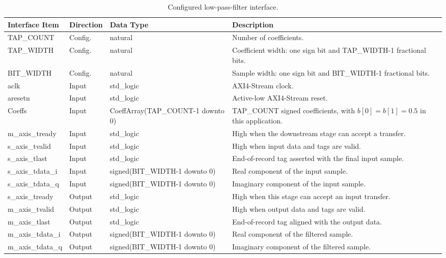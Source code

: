 \begin{table}[H]
\singlespacing
\small
\setlength{\tabcolsep}{2pt}
\renewcommand{\arraystretch}{0.95}
\begin{center}
\caption{Configured low-pass-filter interface.}
\setlength{\tabcolsep}{4pt}
\begin{tabularx}{\textwidth}{|L{0.24\textwidth}|L{0.13\textwidth}|L{0.28\textwidth}|Y|}
\hline
\textbf{Interface Item} & \textbf{Direction} & \textbf{Data Type} & \textbf{Description} \\
\hline
TAP\_COUNT     & Config. & natural & Number of coefficients. \\
\hline
TAP\_WIDTH     & Config. & natural & Coefficient width: one sign bit and TAP\_WIDTH-1 fractional bits. \\
\hline
BIT\_WIDTH     & Config. & natural & Sample width: one sign bit and BIT\_WIDTH-1 fractional bits. \\
\hline
aclk           & Input & std\_logic & AXI4-Stream clock. \\
\hline
aresetn        & Input & std\_logic & Active-low AXI4-Stream reset. \\
\hline
Coeffs         & Input & CoeffArray(\newline TAP\_COUNT-1 \newline downto 0) & TAP\_COUNT signed coefficients, with $b[0]=b[1]=0.5$ in this application. \\
\hline
m\_axis\_tready & Input & std\_logic & High when the downstream stage can accept a transfer. \\
\hline
s\_axis\_tvalid & Input & std\_logic & High when input data and tags are valid. \\
\hline
s\_axis\_tlast & Input & std\_logic & End-of-record tag asserted with the final input sample. \\
\hline
s\_axis\_tdata\_i & Input & signed(BIT\_WIDTH-1 \newline downto 0) & Real component of the input sample. \\
\hline
s\_axis\_tdata\_q & Input & signed(BIT\_WIDTH-1 \newline downto 0) & Imaginary component of the input sample. \\
\hline
s\_axis\_tready & Output & std\_logic & High when this stage can accept an input transfer. \\
\hline
m\_axis\_tvalid & Output & std\_logic & High when output data and tags are valid. \\
\hline
m\_axis\_tlast & Output & std\_logic & End-of-record tag aligned with the output data. \\
\hline
m\_axis\_tdata\_i & Output & signed(BIT\_WIDTH-1 \newline downto 0) & Real component of the filtered sample. \\
\hline
m\_axis\_tdata\_q & Output & signed(BIT\_WIDTH-1 \newline downto 0) & Imaginary component of the filtered sample. \\
\hline
\end{tabularx}
\end{center}
\end{table}

